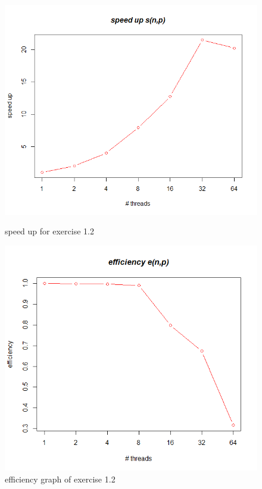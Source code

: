 \documentclass[11pt,a4paper]{article}
\begin{document}
\begin{figure}[h]
\centering
\begin{minipage}{.5\textwidth}
  \centering
  \includegraphics[scale=0.25]{statistics/Ex12SpeedUpGraph.png}
	\caption{speed up for exercise 1.2}
	\label{ex12speedUp}	
\end{minipage}%
\begin{minipage}{.5\textwidth}
  \centering
     \includegraphics[scale=0.25]{statistics/Ex12EfficiencyGraph.png}
	\caption{efficiency graph of exercise 1.2}
	\label{ex12efficiency}	
\end{minipage}
\end{figure}
\end{document}

